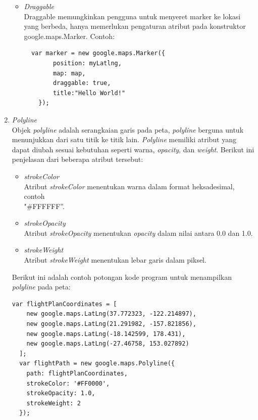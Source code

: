 \begin{enumerate}
\begin{itemize}
  \item \textit{Draggable} \\
  Draggable memungkinkan pengguna untuk menyeret marker ke lokasi yang berbeda,
  hanya memerlukan pengaturan atribut pada konstruktor google.maps.Marker. Contoh:
\begin{verbatim}
  var marker = new google.maps.Marker({
	    position: myLatlng,
	    map: map,
	    draggable: true,
	    title:"Hello World!"
	});
\end{verbatim}
\end{itemize}
\item \textit{Polyline} \\
Objek \textit{polyline} adalah serangkaian garis pada peta, \textit{polyline}
berguna untuk menunjukkan dari satu titik ke titik lain. \textit{Polyline}
memiliki atribut yang dapat diubah sesuai kebutuhan seperti warna,
\textit{opacity}, dan \textit{weight}. Berikut ini penjelasan dari
beberapa atribut tersebut:
\begin{itemize}
  \item \textit{strokeColor} \\
  Atribut \textit{strokeColor} menentukan warna dalam format
  heksadesimal, contoh \\ "\#FFFFFF''.
  
  \item \textit{strokeOpacity} \\
  Atribut \textit{strokeOpacity} menentukan \textit{opacity} dalam nilai antara
  0.0 dan 1.0.
  
  \item \textit{strokeWeight} \\
  Atribut \textit{strokeWeight} menentukan lebar garis dalam piksel.
\end{itemize}
Berikut ini adalah contoh potongan kode program untuk menampilkan
\textit{polyline} pada peta:
\begin{verbatim}
var flightPlanCoordinates = [
    new google.maps.LatLng(37.772323, -122.214897),
    new google.maps.LatLng(21.291982, -157.821856),
    new google.maps.LatLng(-18.142599, 178.431),
    new google.maps.LatLng(-27.46758, 153.027892)
  ];
  var flightPath = new google.maps.Polyline({
    path: flightPlanCoordinates,
    strokeColor: '#FF0000',
    strokeOpacity: 1.0,
    strokeWeight: 2
  });


\end{verbatim}
\end{enumerate}
